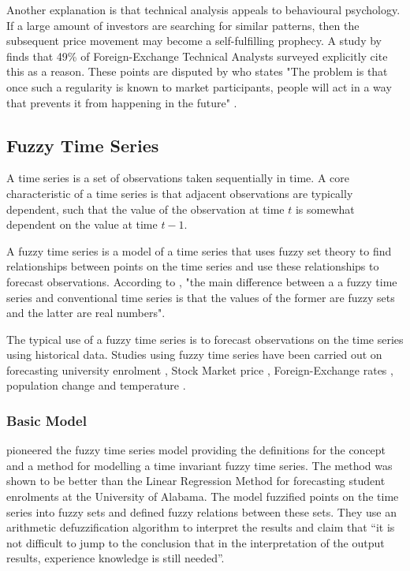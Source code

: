 \documentclass[12pt, oneside, a4paper]{article}
\theoremstyle{definition}
\begin{document}
Another explanation is that technical analysis appeals to behavioural psychology. If a large amount of investors are searching for similar patterns, then the subsequent price movement may become a self-fulfilling prophecy. A study by \cite{examininguse1997} finds that 49\% of Foreign-Exchange Technical Analysts surveyed explicitly cite this as a reason. These points are disputed by \cite[p.~162]{randomwalk2012} who states "The problem is that once such a regularity is known to market participants, people will act in a way that prevents it from happening in the future" .

\subsection{Fuzzy Time Series}

\label{fts}

A time series is a set of observations taken sequentially in time. A core characteristic of a time series is that adjacent observations are typically dependent, such that the value of the observation at time $t$ is somewhat dependent on the value at time $t-1$.

A fuzzy time series is a model of a time series that uses fuzzy set theory to find relationships between points on the time series and use these relationships to forecast observations. According to \cite{chen1996forecasting}, "the main difference between a a fuzzy time series and conventional time series is that the values of the former are fuzzy sets and the latter are real numbers".

The typical use of a fuzzy time series is to forecast observations on the time series using historical data. Studies using fuzzy time series have been carried out on forecasting university enrolment \citep{song1993forecasting, song1994forecasting, chen1996forecasting, tsai2000forecasting, chen2004new, cheng2006trend, lee2006pattern, huarng2006ratio, tsaur2012fuzzy}, Stock Market price \citep{huarng2005type, cheng2006trend, lee2006pattern, huarng2006ratio, Chen2007fib, chu2009fuzzy}, Foreign-Exchange rates \citep{tsaur2012fuzzy}, population change \citep{tsai1999study} and temperature \citep{temperatureprediction2000, lee2006pattern}. 

\subsubsection{Basic Model}
\label{basic}
\cite{song1993forecasting} pioneered the fuzzy time series model providing the definitions for the concept and a method for modelling a time invariant fuzzy time series. The method was shown to be better than the Linear Regression Method for forecasting student enrolments at the University of Alabama. The model fuzzified points on the time series into fuzzy sets and defined fuzzy relations between these sets. They use an arithmetic defuzzification algorithm to interpret the results and claim that ``it is not difficult to jump to the conclusion that in the interpretation of the output results, experience knowledge is still needed''.
 
\end{document}
